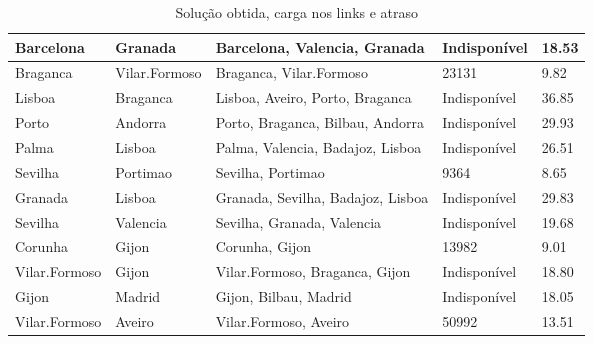 \begin{table}[!htb]
{\begin{tabular}{|l|l|l|l|l|}
Barcelona & Granada & Barcelona, Valencia, Granada & Indisponível & 18.53 \\ \hline
Braganca & Vilar.Formoso & Braganca, Vilar.Formoso & 23131 & 9.82 \\ \hline
Lisboa & Braganca & Lisboa, Aveiro, Porto, Braganca & Indisponível & 36.85 \\ \hline
Porto & Andorra & Porto, Braganca, Bilbau, Andorra & Indisponível & 29.93 \\ \hline
Palma & Lisboa & Palma, Valencia, Badajoz, Lisboa & Indisponível & 26.51 \\ \hline
Sevilha & Portimao & Sevilha, Portimao & 9364 & 8.65 \\ \hline
Granada & Lisboa & Granada, Sevilha, Badajoz, Lisboa & Indisponível & 29.83 \\ \hline
Sevilha & Valencia & Sevilha, Granada, Valencia & Indisponível & 19.68 \\ \hline
Corunha & Gijon & Corunha, Gijon & 13982 & 9.01 \\ \hline
Vilar.Formoso & Gijon & Vilar.Formoso, Braganca, Gijon & Indisponível & 18.80 \\ \hline
Gijon & Madrid & Gijon, Bilbau, Madrid & Indisponível & 18.05 \\ \hline
Vilar.Formoso & Aveiro & Vilar.Formoso, Aveiro & 50992 & 13.51 \\ \hline
\end{tabular}}
\caption[]{Solução obtida, carga nos links e atraso}
\end{table}

\begin{table}[!htb]
        \centering
\caption[]{Solução obtida, carga nos links e atraso}
\end{table}

